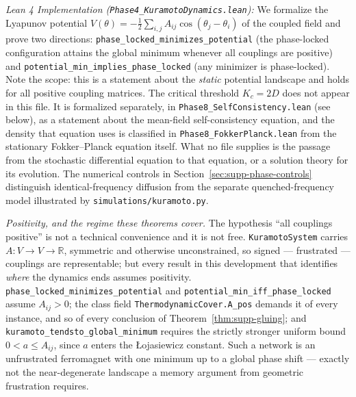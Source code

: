 \documentclass{article}
\begin{document}
\textit{Lean 4 Implementation (\nolinkurl{Phase4_KuramotoDynamics.lean}):} We formalize the Lyapunov potential $V(\theta) = -\tfrac{1}{2}\sum_{i,j} A_{ij}\cos(\theta_j - \theta_i)$ of the coupled field and prove two directions: \nolinkurl{phase_locked_minimizes_potential} (the phase-locked configuration attains the global minimum whenever all couplings are positive) and \nolinkurl{potential_min_implies_phase_locked} (any minimizer is phase-locked). Note the scope: this is a statement about the \emph{static} potential landscape and holds for all positive coupling matrices. The critical threshold $K_c = 2D$ does not appear in this file. It is formalized separately, in \nolinkurl{Phase8_SelfConsistency.lean} (see below), as a statement about the mean-field self-consistency equation, and the density that equation uses is classified in \nolinkurl{Phase8_FokkerPlanck.lean} from the stationary Fokker--Planck equation itself. What no file supplies is the passage from the stochastic differential equation to that equation, or a solution theory for its evolution. The numerical controls in Section~\ref{sec:supp-phase-controls} distinguish identical-frequency diffusion from the separate quenched-frequency model illustrated by \texttt{simulations/kuramoto.py}.

\textit{Positivity, and the regime these theorems cover.} The hypothesis ``all couplings positive'' is not a technical convenience and it is not free. \texttt{KuramotoSystem} carries $A : V \to V \to \mathbb{R}$, symmetric and otherwise unconstrained, so signed --- frustrated --- couplings are representable; but every result in this development that identifies \emph{where} the dynamics ends assumes positivity. \nolinkurl{phase_locked_minimizes_potential} and \nolinkurl{potential_min_iff_phase_locked} assume $A_{ij} > 0$; the class field \nolinkurl{ThermodynamicCover.A_pos} demands it of every instance, and so of every conclusion of Theorem~\ref{thm:supp-gluing}; and \nolinkurl{kuramoto_tendsto_global_minimum} requires the strictly stronger uniform bound $0 < a \le A_{ij}$, since $a$ enters the {\L}ojasiewicz constant. Such a network is an unfrustrated ferromagnet with one minimum up to a global phase shift --- exactly not the near-degenerate landscape a memory argument from geometric frustration requires.
\end{document}
